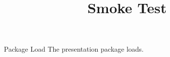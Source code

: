 \documentclass{beamer}
\title{Smoke Test}
\begin{document}
\begin{frame}{Package Load}
The presentation package loads.
\end{frame}
\end{document}
